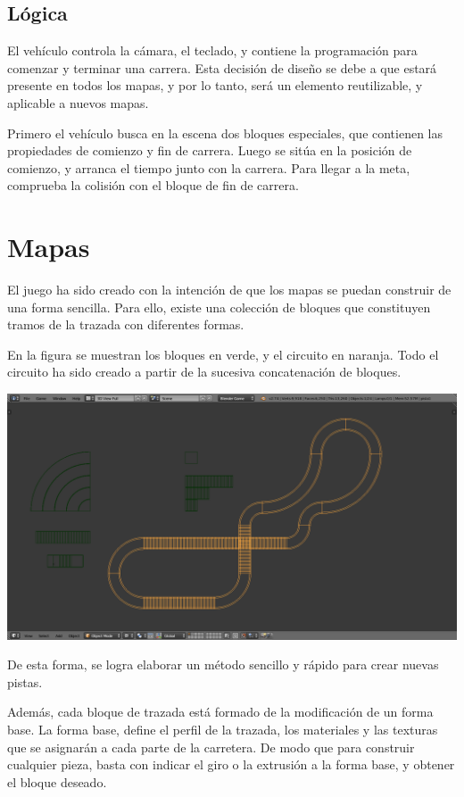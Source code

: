 \documentclass[10pt,a4paper,hidelinks]{article}
\begin{document}
\subsection{Lógica}
El vehículo controla la cámara, el teclado, y contiene la programación para 
comenzar y terminar una carrera. Esta decisión de diseño se debe a que estará 
presente en todos los mapas, y por lo tanto, será un elemento reutilizable, y 
aplicable a nuevos mapas.

Primero el vehículo busca en la escena dos bloques especiales, que contienen las 
propiedades de comienzo y fin de carrera. Luego se sitúa en la posición de 
comienzo, y arranca el tiempo junto con la carrera. Para llegar a la meta, 
comprueba la colisión con el bloque de fin de carrera.

\section{Mapas}
El juego ha sido creado con la intención de que los mapas se puedan construir de 
una forma sencilla. Para ello, existe una colección de bloques que constituyen 
tramos de la trazada con diferentes formas.

En la figura se muestran los bloques en verde, y el circuito en naranja. Todo el 
circuito ha sido creado a partir de la sucesiva concatenación de bloques.

\includegraphics[width=\textwidth]{bloques}

De esta forma, se logra elaborar un método sencillo y rápido para crear nuevas 
pistas.

Además, cada bloque de trazada está formado de la modificación de un forma base.  
La forma base, define el perfil de la trazada, los materiales y las texturas que 
se asignarán a cada parte de la carretera. De modo que para construir cualquier 
pieza, basta con indicar el giro o la extrusión a la forma base, y obtener el 
bloque deseado.
\end{document}
